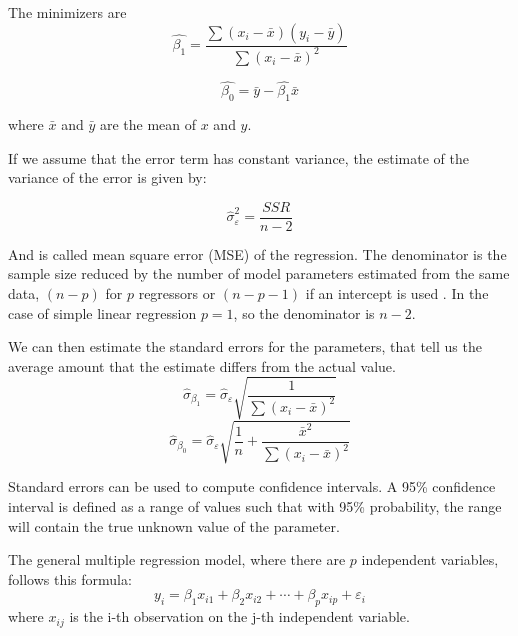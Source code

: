 The minimizers are
\begin{equation}
	 \widehat{\beta_{1}} = \frac{\sum(x_i - \bar{x})(y_i - \bar{y})}{\sum(x_i - \bar{x})^2}
\end{equation}

\begin{equation}
	\widehat{\beta_{0}} = \bar{y} - \widehat{\beta_{1}} \bar {x}
\end{equation}

where $\bar{x}$ and $\bar{y}$ are the mean of $x$ and $y$.

If we assume that the error term has constant variance, the estimate of the variance of the error is given by:

\begin{equation}
	\widehat{\sigma}_{\varepsilon }^{2} = \frac{SSR}{n-2}
\end{equation}

And is called mean square error (MSE) of the regression. The denominator is the sample size reduced by the number of model parameters estimated from the same data, $(n-p)$ for $p$ regressors or  $(n-p-1)$ if an intercept is used \cite{MSE}. In the case of simple linear regression $p=1$, so the denominator is $n-2$.

We can then estimate the standard errors for the parameters, that tell us the average amount that the estimate differs from the actual value.
\begin{equation}
	{\widehat{\sigma}_{\beta _{1}} = {\widehat{\sigma}_{\varepsilon}{\sqrt{\frac{1}{\sum(x_{i} - {\bar {x}})^{2}}}}}}
\end{equation}
\begin{equation}
	{\widehat{\sigma}_{\beta _{0}} = {\widehat{\sigma}_{\varepsilon}{\sqrt{\frac{1}{n} + \frac{\bar{x}^2}{\sum(x_{i} - {\bar {x}})^{2}}}}}}
\end{equation}

Standard errors can be used to compute confidence intervals. A 95\% confidence interval is defined as a range of values such that with 95\% probability, the range will contain the true unknown value of the parameter.

The general multiple regression model, where there are $p$ independent variables, follows this formula:
\begin{equation}
	y_{i}=\beta_{1}x_{i1} + \beta_{2}x_{i2} + \cdots + \beta_{p}x_{ip} + \varepsilon_{i}
\end{equation}
where $x_{ij}$ is the i-th observation on the j-th independent variable.

